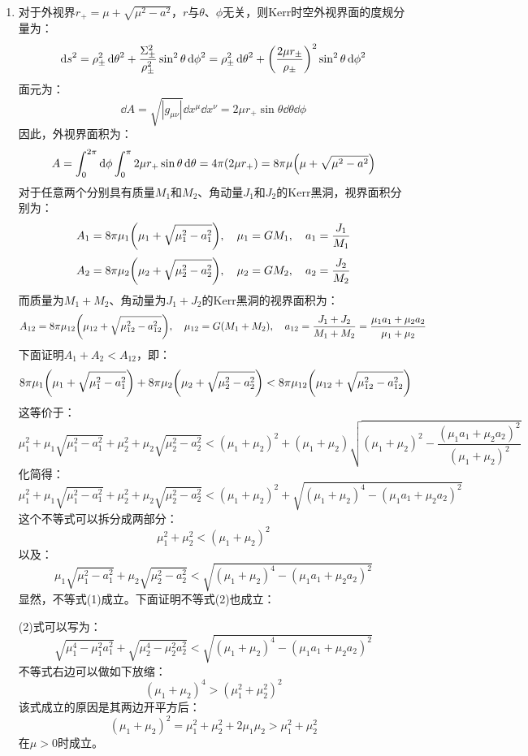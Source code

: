 \documentclass[a4paper]{article}
\begin{document}
\begin{enumerate}
    \item[10.]
    对于外视界$r_+ = \mu + \sqrt{\mu^2 - a^2}$，$r$与$\theta$、$\phi$无关，则Kerr时空外视界面的度规分量为：
    \[
        \dd{s}^2 = \rho_\pm^2 \dd{\theta}^2 + \frac{\Sigma_\pm^2}{\rho_\pm^2} \sin^2{\theta} \dd{\phi}^2 = \rho_\pm^2 \dd{\theta}^2 + \qty(\frac{2\mu r_\pm}{\rho_\pm})^2 \sin^2{\theta} \dd{\phi}^2
    \]
    面元为：
    \[
        \dd{A} = \sqrt{|g_{\mu\nu}|} \dd{x^\mu} \dd{x^\nu} = 2\mu r_+ \sin{\theta} \dd{\theta} \dd{\phi}
    \]
    因此，外视界面积为：
    \[
        A = \int_0^{2\pi} \dd{\phi} \int_0^\pi 2\mu r_+ \sin{\theta} \dd{\theta} = 4\pi (2\mu r_+) = 8\pi \mu \qty(\mu + \sqrt{\mu^2 - a^2})
    \]
    对于任意两个分别具有质量$M_1$和$M_2$、角动量$J_1$和$J_2$的Kerr黑洞，视界面积分别为：
    \[
        A_1 = 8\pi \mu_1 \qty(\mu_1 + \sqrt{\mu_1^2 - a_1^2}),\quad \mu_1 = GM_1,\quad a_1 = \frac{J_1}{M_1}
    \]
    \[
        A_2 = 8\pi \mu_2 \qty(\mu_2 + \sqrt{\mu_2^2 - a_2^2}),\quad \mu_2 = GM_2,\quad a_2 = \frac{J_2}{M_2}
    \]
    而质量为$M_1 + M_2$、角动量为$J_1 + J_2$的Kerr黑洞的视界面积为：
    \[
        A_{12} = 8\pi \mu_{12} \qty(\mu_{12} + \sqrt{\mu_{12}^2 - a_{12}^2}),\quad \mu_{12} = G(M_1 + M_2),\quad a_{12} = \frac{J_1 + J_2}{M_1 + M_2} = \frac{\mu_1 a_1 + \mu_2 a_2}{\mu_1 + \mu_2}
    \]
    下面证明$A_1 + A_2 < A_{12}$，即：
    \[
        8\pi \mu_1 \qty(\mu_1 + \sqrt{\mu_1^2 - a_1^2}) + 8\pi \mu_2 \qty(\mu_2 + \sqrt{\mu_2^2 - a_2^2}) < 8\pi \mu_{12} \qty(\mu_{12} + \sqrt{\mu_{12}^2 - a_{12}^2})
    \]
    这等价于：
    \[
        \mu_1^2 + \mu_1 \sqrt{\mu_1^2 - a_1^2} + \mu_2^2 + \mu_2 \sqrt{\mu_2^2 - a_2^2} < (\mu_1 + \mu_2)^2 + (\mu_1 + \mu_2) \sqrt{(\mu_1 + \mu_2)^2 - \frac{(\mu_1 a_1 + \mu_2 a_2)^2}{(\mu_1 + \mu_2)^2}}
    \]
    化简得：
    \[
        \mu_1^2 + \mu_1 \sqrt{\mu_1^2 - a_1^2} + \mu_2^2 + \mu_2 \sqrt{\mu_2^2 - a_2^2} < (\mu_1 + \mu_2)^2 + \sqrt{(\mu_1 + \mu_2)^4 - (\mu_1 a_1 + \mu_2 a_2)^2}
    \]
    这个不等式可以拆分成两部分：
    \begin{equation}
        \mu_1^2 + \mu_2^2 < (\mu_1 + \mu_2)^2
    \end{equation}
    以及：
    \begin{equation}
        \mu_1 \sqrt{\mu_1^2 - a_1^2} + \mu_2 \sqrt{\mu_2^2 - a_2^2} < \sqrt{(\mu_1 + \mu_2)^4 - (\mu_1 a_1 + \mu_2 a_2)^2}
    \end{equation}
    显然，不等式(1)成立。下面证明不等式(2)也成立：

    (2)式可以写为：
    \[
        \sqrt{\mu_1^4 - \mu_1^2 a_1^2} + \sqrt{\mu_2^4 - \mu_2^2 a_2^2} < \sqrt{(\mu_1 + \mu_2)^4 - (\mu_1 a_1 + \mu_2 a_2)^2}
    \]
    不等式右边可以做如下放缩：
    \[
        (\mu_1 + \mu_2)^4 > (\mu_1^2 + \mu_2^2)^2
    \]
    该式成立的原因是其两边开平方后：
    \[
        (\mu_1 + \mu_2)^2 = \mu_1^2 + \mu_2^2 + 2\mu_1 \mu_2 > \mu_1^2 + \mu_2^2
    \]
    在$\mu > 0$时成立。


\end{enumerate}
\end{document}
